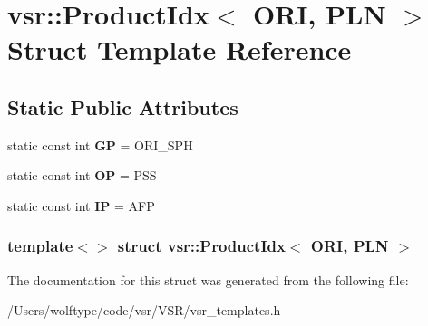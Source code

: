 \hypertarget{structvsr_1_1_product_idx_3_01_o_r_i_00_01_p_l_n_01_4}{\section{vsr\-:\-:Product\-Idx$<$ O\-R\-I, P\-L\-N $>$ Struct Template Reference}
\label{structvsr_1_1_product_idx_3_01_o_r_i_00_01_p_l_n_01_4}
}
\subsection*{Static Public Attributes}
\begin{DoxyCompactItemize}
\item 
\hypertarget{structvsr_1_1_product_idx_3_01_o_r_i_00_01_p_l_n_01_4_a1964b00a3e1c4f5d8e3e1ab99f8b7e0b}{static const int {\bfseries G\-P} = O\-R\-I\-\_\-\-S\-P\-H}\label{structvsr_1_1_product_idx_3_01_o_r_i_00_01_p_l_n_01_4_a1964b00a3e1c4f5d8e3e1ab99f8b7e0b}

\item 
\hypertarget{structvsr_1_1_product_idx_3_01_o_r_i_00_01_p_l_n_01_4_a9fdc570907a05cfdbfe6beb8dbab9117}{static const int {\bfseries O\-P} = P\-S\-S}\label{structvsr_1_1_product_idx_3_01_o_r_i_00_01_p_l_n_01_4_a9fdc570907a05cfdbfe6beb8dbab9117}

\item 
\hypertarget{structvsr_1_1_product_idx_3_01_o_r_i_00_01_p_l_n_01_4_a2070e298ec74d6bccb8fa85e72d1536a}{static const int {\bfseries I\-P} = A\-F\-P}\label{structvsr_1_1_product_idx_3_01_o_r_i_00_01_p_l_n_01_4_a2070e298ec74d6bccb8fa85e72d1536a}

\end{DoxyCompactItemize}
\subsubsection*{template$<$$>$ struct vsr\-::\-Product\-Idx$<$ O\-R\-I, P\-L\-N $>$}



The documentation for this struct was generated from the following file\-:\begin{DoxyCompactItemize}
\item 
/\-Users/wolftype/code/vsr/\-V\-S\-R/vsr\-\_\-templates.\-h\end{DoxyCompactItemize}
